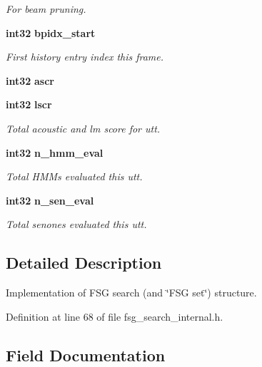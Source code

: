 \begin{DoxyCompactItemize}
\begin{DoxyCompactList}\small\item\em \-For beam pruning. \end{DoxyCompactList}\item 
{\bf int32} {\bf bpidx\-\_\-start}\label{structfsg__search__s_a24d59609008ac132dca256d36a89f9c8}

\begin{DoxyCompactList}\small\item\em \-First history entry index this frame. \end{DoxyCompactList}\item 
{\bf int32} {\bfseries ascr}\label{structfsg__search__s_aac3c130a5777edd2a227fd064eaefbf2}

\item 
{\bf int32} {\bf lscr}\label{structfsg__search__s_a709277a80e9418ecc3e63296f8eb6bbf}

\begin{DoxyCompactList}\small\item\em \-Total acoustic and lm score for utt. \end{DoxyCompactList}\item 
{\bf int32} {\bf n\-\_\-hmm\-\_\-eval}\label{structfsg__search__s_a7e3d7375b4a33af339e8b55885677faa}

\begin{DoxyCompactList}\small\item\em \-Total \-H\-M\-Ms evaluated this utt. \end{DoxyCompactList}\item 
{\bf int32} {\bf n\-\_\-sen\-\_\-eval}\label{structfsg__search__s_a56494e3b30d0c66367c7ef055b8addb2}

\begin{DoxyCompactList}\small\item\em \-Total senones evaluated this utt. \end{DoxyCompactList}\end{DoxyCompactItemize}


\subsection{\-Detailed \-Description}
\-Implementation of \-F\-S\-G search (and \char`\"{}\-F\-S\-G set\char`\"{}) structure. 

\-Definition at line 68 of file fsg\-\_\-search\-\_\-internal.\-h.



\subsection{\-Field \-Documentation}
